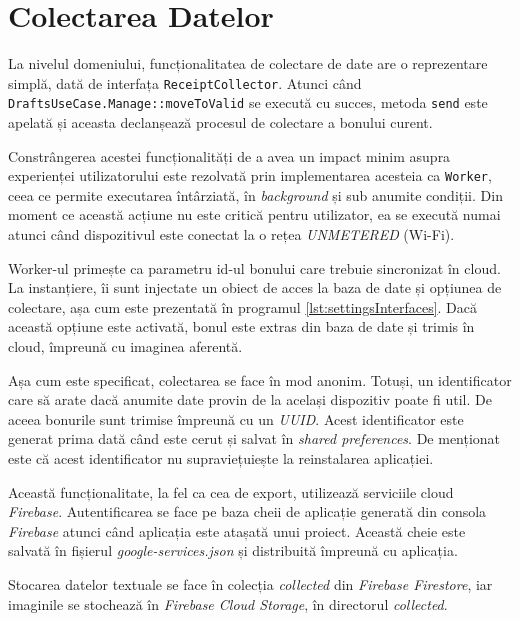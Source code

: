 \section{Colectarea Datelor}

La nivelul domeniului, funcționalitatea de colectare de date are o reprezentare simplă, dată de interfața \texttt{ReceiptCollector}. Atunci când \texttt{DraftsUseCase.Manage::moveToValid} se execută cu succes, metoda \texttt{send} este apelată și aceasta declanșează procesul de colectare a bonului curent.



Constrângerea acestei funcționalități de a avea un impact minim asupra experienței utilizatorului este rezolvată prin implementarea acesteia ca \texttt{Worker}, ceea ce permite executarea întârziată, în \emph{background} și sub anumite condiții. Din moment ce această acțiune nu este critică pentru utilizator, ea se execută numai atunci când dispozitivul este conectat la o rețea \emph{UNMETERED} (Wi-Fi).

Worker-ul primește ca parametru id-ul bonului care trebuie sincronizat în cloud. La instanțiere, îi sunt injectate un obiect de acces la baza de date și opțiunea de colectare, așa cum este prezentată în programul \ref{lst:settingsInterfaces}. Dacă această opțiune este activată, bonul este extras din baza de date și trimis în cloud, împreună cu imaginea aferentă.

Așa cum este specificat, colectarea se face în mod anonim. Totuși, un identificator care să arate dacă anumite date provin de la același dispozitiv poate fi util. De aceea bonurile sunt trimise împreună cu un \emph{UUID}. Acest identificator este generat prima dată când este cerut și salvat în \emph{shared preferences}. De menționat este că acest identificator nu supraviețuiește la reinstalarea aplicației.

Această funcționalitate, la fel ca cea de export, utilizează serviciile cloud \emph{Firebase}. Autentificarea se face pe baza cheii de aplicație generată din consola \emph{Firebase} atunci când aplicația este atașată unui proiect. Această cheie este salvată în fișierul \emph{google-services.json} și distribuită împreună cu aplicația.

Stocarea datelor textuale se face în colecția \emph{collected} din \emph{Firebase Firestore}, iar imaginile se stochează în \emph{Firebase Cloud Storage}, în directorul \emph{collected}.

